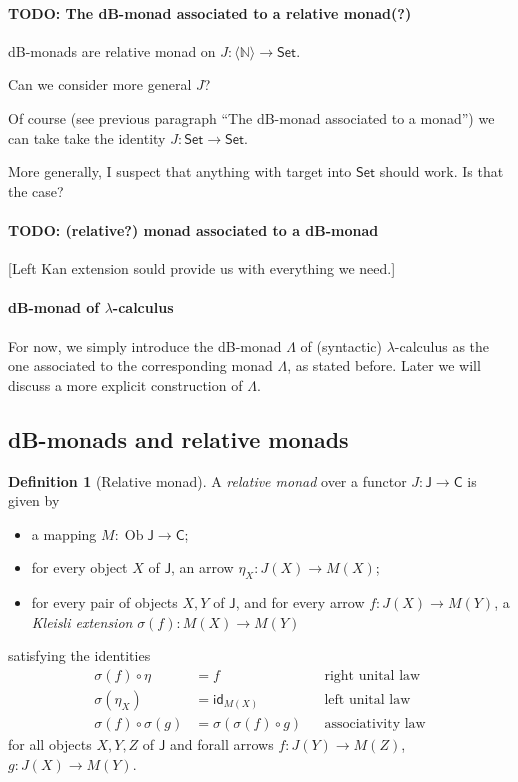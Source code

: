 \documentclass[a4paper,twoside,12pt]{article}
\theoremstyle{definition}
\newtheorem{definition}{Definition}
\theoremstyle{remark}
\DeclareMathOperator{\Ob}{Ob}
\newcommand{\NN}{\mathbb{N}}
\begin{document}
\paragraph{TODO: The dB-monad associated to a relative monad(?)}

dB-monads are relative monad on $J\colon \langle \NN
\rangle \to \mathsf{Set}$.

Can we consider more general $J$?

Of course (see previous paragraph ``The dB-monad associated to a
monad'') we can take take the identity $J:\mathsf{Set} \to
\mathsf{Set}$.

More generally, I suspect that anything with target into
$\mathsf{Set}$ should work.  Is that the case?


\paragraph{TODO: (relative?) monad associated to a dB-monad}

[Left Kan extension sould provide us with everything we need.]

\paragraph{dB-monad of $\lambda$-calculus}

For now, we simply introduce the dB-monad $\mathsf{\Lambda}$ of
(syntactic) $\lambda$-calculus as the one associated to the
corresponding monad $\Lambda$, as stated before.  Later we will
discuss a more explicit construction of $\mathtt{\Lambda}$.

\subsection{dB-monads and relative monads}
\label{sec:subst-rel-monads}

\begin{definition}[Relative monad]
  A \emph{relative monad} over a functor
  $J\colon \mathsf{J}\to \mathsf{C}$ is given by
  \begin{itemize}
  \item a mapping $M:\Ob \mathsf{J} \to \mathsf{C}$;
  \item for every object $X$ of $\mathsf{J}$, an arrow $\eta_X\colon
    J(X) \to M(X)$;
  \item for every pair of objects $X,Y$ of $\mathsf{J}$, and for every
    arrow $f\colon J(X) \to M(Y)$, a \emph{Kleisli extension}
    $\sigma(f) \colon M(X) \to M(Y)$
  \end{itemize}
  satisfying the identities
  \begin{align*}
    \sigma(f) \circ \eta &= f &&\text{right unital law} \\
    \sigma(\eta_X) &= \mathsf{id}_{M(X)} &&\text{left unital law} \\
    \sigma(f) \circ \sigma(g) &= \sigma(\sigma(f) \circ g) &&\text{associativity law}
  \end{align*}
  for all objects $X,Y,Z$ of $\mathsf{J}$ and forall arrows
  $f\colon J(Y)\to M(Z)$, $g\colon J(X)\to M(Y)$.
\end{definition}
\end{document}

